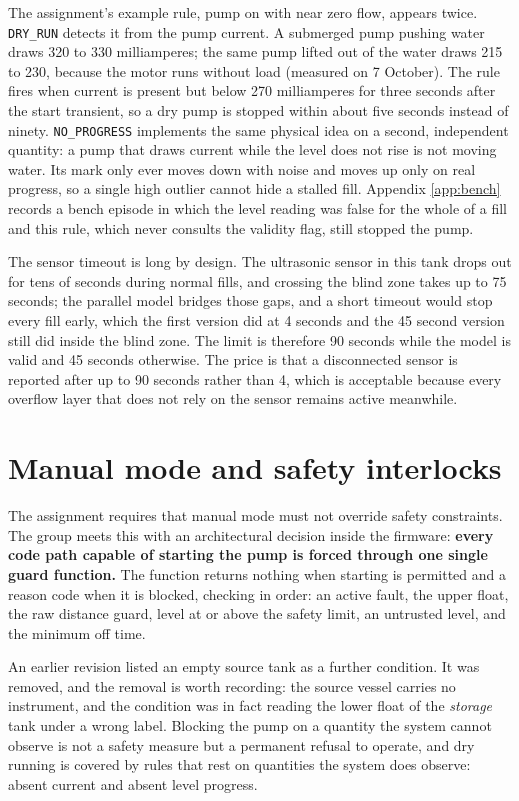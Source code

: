 The assignment's example rule, pump on with near zero flow, appears twice. \texttt{DRY\_RUN} detects it from the pump current. A submerged pump pushing water draws 320 to 330 milliamperes; the same pump lifted out of the water draws 215 to 230, because the motor runs without load (measured on 7 October). The rule fires when current is present but below 270 milliamperes for three seconds after the start transient, so a dry pump is stopped within about five seconds instead of ninety. \texttt{NO\_PROGRESS} implements the same physical idea on a second, independent quantity: a pump that draws current while the level does not rise is not moving water. Its mark only ever moves down with noise and moves up only on real progress, so a single high outlier cannot hide a stalled fill. Appendix \ref{app:bench} records a bench episode in which the level reading was false for the whole of a fill and this rule, which never consults the validity flag, still stopped the pump.

The sensor timeout is long by design. The ultrasonic sensor in this tank drops out for tens of seconds during normal fills, and crossing the blind zone takes up to 75 seconds; the parallel model bridges those gaps, and a short timeout would stop every fill early, which the first version did at 4 seconds and the 45 second version still did inside the blind zone. The limit is therefore 90 seconds while the model is valid and 45 seconds otherwise. The price is that a disconnected sensor is reported after up to 90 seconds rather than 4, which is acceptable because every overflow layer that does not rely on the sensor remains active meanwhile.

\section{Manual mode and safety interlocks}
\label{sec:o6-5}

The assignment requires that manual mode must not override safety constraints. The group meets this with an architectural decision inside the firmware: \textbf{every code path capable of starting the pump is forced through one single guard function.} The function returns nothing when starting is permitted and a reason code when it is blocked, checking in order: an active fault, the upper float, the raw distance guard, level at or above the safety limit, an untrusted level, and the minimum off time.

An earlier revision listed an empty source tank as a further condition. It was removed, and the removal is worth recording: the source vessel carries no instrument, and the condition was in fact reading the lower float of the \emph{storage} tank under a wrong label. Blocking the pump on a quantity the system cannot observe is not a safety measure but a permanent refusal to operate, and dry running is covered by rules that rest on quantities the system does observe: absent current and absent level progress.

